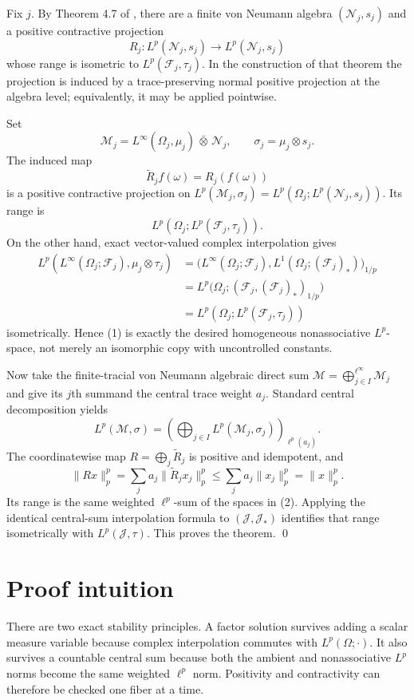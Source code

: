\documentclass[10pt]{article}
\newcommand{\J}{\mathcal J}
\newcommand{\F}{\mathcal F}
\newcommand{\M}{\mathcal M}
\newcommand{\N}{\mathcal N}
\begin{document}
Fix $j$.  By Theorem 4.7 of \cite{Arhancet2023}, there are a finite von
Neumann algebra $(\N_j,s_j)$ and a positive contractive projection
\[
 R_j:L^p(\N_j,s_j)\longrightarrow L^p(\N_j,s_j)
\]
whose range is isometric to $L^p(\F_j,\tau_j)$.  In the construction of that
theorem the projection is induced by a trace-preserving normal positive
projection at the algebra level; equivalently, it may be applied pointwise.

Set
\[
 \M_j=L^\infty(\Omega_j,\mu_j)\,\bar\otimes\,\N_j,
 \qquad
 \sigma_j=\mu_j\otimes s_j.
\]
The induced map
\[
 \widetilde R_j f(\omega)=R_j(f(\omega))
\]
is a positive contractive projection on
$L^p(\M_j,\sigma_j)=L^p(\Omega_j;L^p(\N_j,s_j))$.  Its range is
\[
 L^p(\Omega_j;L^p(\F_j,\tau_j)).                                      \tag{1}
\]
On the other hand, exact vector-valued complex interpolation gives
\begin{align*}
 L^p(L^\infty(\Omega_j;\F_j),\mu_j\otimes\tau_j)
 &=\big(L^\infty(\Omega_j;\F_j),L^1(\Omega_j;(\F_j)_*)\big)_{1/p}\\
 &=L^p\big(\Omega_j;(\F_j,(\F_j)_*)_{1/p}\big)\\
 &=L^p(\Omega_j;L^p(\F_j,\tau_j))                                    \tag{2}
\end{align*}
isometrically.  Hence (1) is exactly the desired homogeneous
nonassociative $L^p$-space, not merely an isomorphic copy with uncontrolled
constants.

Now take the finite-tracial von Neumann algebraic direct sum
$\M=\bigoplus_{j\in I}^{\ell^\infty}\M_j$ and give its $j$th summand the
central trace weight $a_j$.  Standard central decomposition yields
\[
 L^p(\M,\sigma)=
 \left(\bigoplus_{j\in I}L^p(\M_j,\sigma_j)\right)_{\ell^p(a_j)}.
\]
The coordinatewise map $R=\bigoplus_j\widetilde R_j$ is positive and
idempotent, and
\[
 \|Rx\|_p^p=\sum_j a_j\|\widetilde R_jx_j\|_p^p
 \le \sum_j a_j\|x_j\|_p^p=\|x\|_p^p.
\]
Its range is the same weighted $\ell^p$-sum of the spaces in (2).  Applying
the identical central-sum interpolation formula to $(\J,\J_*)$ identifies
that range isometrically with $L^p(\J,\tau)$.  This proves the theorem. \qed

\section*{Proof intuition}

There are two exact stability principles.  A factor solution survives adding
a scalar measure variable because complex interpolation commutes with
$L^p(\Omega;\cdot)$.  It also survives a countable central sum because both
the ambient and nonassociative $L^p$ norms become the same weighted
$\ell^p$ norm.  Positivity and contractivity can therefore be checked one
fiber at a time.
\end{document}
